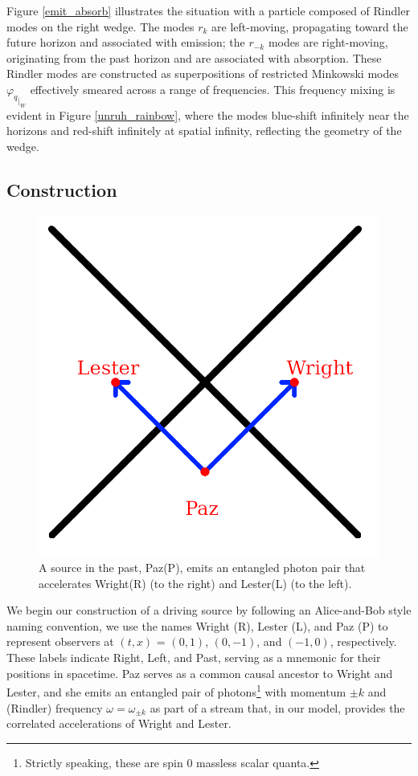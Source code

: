 \documentclass[12pt,a4paper]{article}
\begin{document}
Figure \ref{emit_absorb} illustrates the situation with a particle composed of Rindler modes on the right wedge. The modes $r_k$ are left-moving, propagating toward the future horizon and associated with emission; the $r_{-k}$ modes are right-moving, originating from the past horizon and are associated with absorption. These Rindler modes are constructed as superpositions of restricted Minkowski modes ${\varphi_q}_{|_W}$ effectively smeared across a range of frequencies.  This frequency mixing is evident in Figure \ref{unruh_rainbow}, where the modes blue-shift infinitely near the horizons and red-shift infinitely at spatial infinity, reflecting the geometry of the wedge.

\subsection{Construction}

\begin{figure}[h]
\centering
\includegraphics[scale=0.75]{paz.png}
\captionsetup{width=0.7\textwidth}
\caption{A source in the past, Paz(P), emits an entangled photon pair that accelerates Wright(R) (to the right) and Lester(L) (to the left).}
\label{paz}
\end{figure}


We begin our construction of a driving source by following an Alice-and-Bob style naming convention, we use the names Wright (R), Lester (L), and Paz (P) to represent observers at $(t,x)$ = $(0,1)$, $(0,-1)$, and $(-1,0)$, respectively. These labels indicate Right, Left, and Past, serving as a mnemonic for their positions in spacetime. Paz serves as a common causal ancestor to Wright and Lester, and she emits an entangled pair of photons\footnote{Strictly speaking, these are spin 0 massless scalar quanta.} with momentum $\pm k$ and (Rindler) frequency $\omega = \omega_{\pm k}$ as part of a stream that, in our model, provides the correlated accelerations of Wright and Lester.
\end{document}
